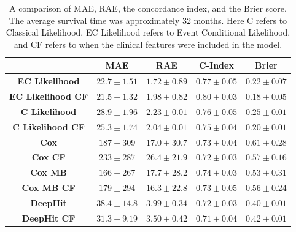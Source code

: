 \documentclass[portrait, color=UCLburgundy, margin=1cm]{uclposter}
\begin{document}
\begin{multicols}{2}
        \begin{table}[H]
            \centering
            
            \captionsetup{singlelinecheck=false, justification=centering}
            \caption{
                A comparison of \gls{MAE}, \gls{RAE}, the concordance index, and the Brier score. The average survival time was approximately $32$ months. Here C refers to Classical Likelihood, EC Likelihood refers to Event Conditional Likelihood, and CF refers to when the clinical features were included in the model.
            }
            
            \resizebox*{1.0\linewidth}{!}
            {
                \begin{tabular}{||c|cc|c|c||}
                    \hline
                    & \textbf{\gls{MAE}} & \textbf{\gls{RAE}} & \textbf{C-Index}  & \textbf{Brier}    \\
                    \hline
                    \textbf{EC Likelihood}      & $22.7\pm1.51$      & $1.72\pm0.89$      & $0.77\pm0.05$     & $0.22\pm0.07$      \\
                    \textbf{EC Likelihood CF}   & $21.5\pm1.32$      & $1.98\pm0.82$      & $0.80\pm0.03$     & $0.18\pm0.05$      \\
                    \textbf{C Likelihood}       & $28.9\pm1.96$      & $2.23\pm0.01$      & $0.76\pm0.05$     & $0.25\pm0.01$      \\
                    \textbf{C Likelihood CF}    & $25.3\pm1.74$      & $2.04\pm0.01$      & $0.75\pm0.04$     & $0.20\pm0.01$      \\
                    \hline
                    \textbf{Cox}                & $187 \pm309 $      & $17.0\pm30.7$      & $0.73\pm0.04$     & $0.61\pm0.28$      \\
                    \textbf{Cox CF}             & $233 \pm287 $      & $26.4\pm21.9$      & $0.72\pm0.03$     & $0.57\pm0.16$      \\
                    \textbf{Cox \gls{MB}}       & $166 \pm267 $      & $17.7\pm28.2$      & $0.74\pm0.03$     & $0.53\pm0.31$      \\
                    \textbf{Cox \gls{MB} CF}    & $179 \pm294 $      & $16.3\pm22.8$      & $0.73\pm0.05$     & $0.56\pm0.24$      \\
                    \hline
                    \textbf{DeepHit}            & $38.4\pm14.8$      & $3.99\pm0.34$      & $0.72\pm0.03$     & $0.40\pm0.01$      \\
                    \textbf{DeepHit CF}         & $31.3\pm9.19$      & $3.50\pm0.42$      & $0.71\pm0.04$     & $0.42\pm0.01$      \\
                    \hline
                \end{tabular}
            }
        \end{table}
        

\end{multicols}
\end{document}
